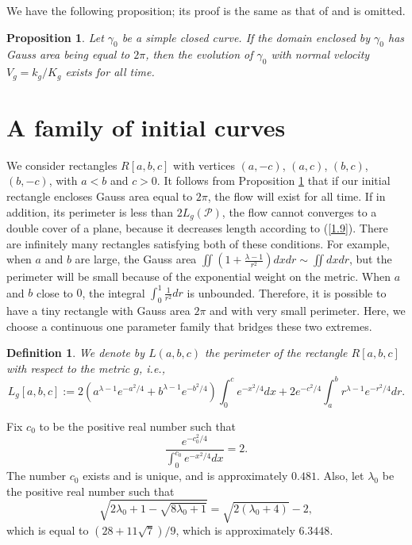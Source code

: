 \documentclass{amsart}
\theoremstyle{Corollary}
\newtheorem{prop}[theorem]{Proposition}
\newtheorem{defn}[theorem]{Definition}
\numberwithin{equation}{section}
\begin{document}
We have the following proposition; its proof is the same as that of  \cite[Proposition 5]{Drugan&Nguyen}
and is omitted.

\begin{prop}\label{prop7}
Let $\gamma_0$ be a simple closed curve.
If the domain enclosed by $\gamma_0$ has Gauss area being equal to $2\pi$,
then the evolution of $\gamma_0$ with normal velocity $V_g=k_g/K_g$ exists for all time.
\end{prop}



\section{A family of initial curves}


We consider rectangles $R[a,b,c]$ with vertices $(a,-c)$, $(a,c)$,
$(b,c)$, $(b,-c)$, with $a<b$ and $c>0$.
It follows from Proposition \ref{prop7} that if our initial rectangle encloses
Gauss area equal to $2\pi$,
the flow will exist for all time.
If in addition, its perimeter
is less than
$2L_g(\mathcal{P})$,
the flow cannot converges
to a double cover of a plane,
because it decreases length according to (\ref{1.9}).
There are infinitely many rectangles satisfying
both of these conditions.
For example,
when $a$ and $b$ are large,
the Gauss area
$\displaystyle\iint\left(1+\frac{\lambda-1}{r^2}\right)dxdr\sim \iint dxdr$,
but the perimeter will be small because of the exponential weight on the metric.
When $a$ and $b$ close to $0$,
the integral $\displaystyle\int_0^1\frac{1}{r^2}dr$ is unbounded.
Therefore, it is possible
to have a tiny rectangle with Gauss area $2\pi$ and with very small perimeter.
Here, we choose a continuous one parameter family that bridges
these two extremes.

\begin{defn}
\emph{We denote by $L(a,b,c)$ the perimeter of the rectangle $R[a,b,c]$ with respect
to the metric $g$, i.e.,}
\begin{equation}\label{2.1}
L_g[a,b,c]
:=2(a^{\lambda-1} e^{-a^2/4}+b^{\lambda-1} e^{-b^2/4})\int_0^ce^{-x^2/4}dx
+2e^{-c^2/4}\int_a^b r^{\lambda-1} e^{-r^2/4}dr.
\end{equation}
\end{defn}

Fix $c_0$ to be the positive real number such that
\begin{equation}\label{2.2}
\frac{e^{-c_0^2/4}}{\int_0^{c_0}e^{-x^2/4}dx}=2.
\end{equation}
The number $c_0$ exists and is unique, and is approximately $0.481$.
Also, let $\lambda_0$ be the positive real number such that
$$\sqrt{2\lambda_0+1-\sqrt{8\lambda_0+1}}=\sqrt{2(\lambda_0+4)}-2,$$
which is equal to $(28+11\sqrt{7})/9$, which is approximately $6.3448$.
\end{document}

